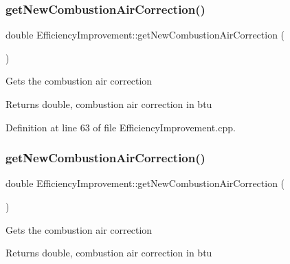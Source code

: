 \subsubsection{\texorpdfstring{get\+New\+Combustion\+Air\+Correction()}{getNewCombustionAirCorrection()}\hspace{0.1cm}{\footnotesize\ttfamily [2/3]}}
{\footnotesize\ttfamily double Efficiency\+Improvement\+::get\+New\+Combustion\+Air\+Correction (\begin{DoxyParamCaption}{ }\end{DoxyParamCaption})}

Gets the combustion air correction

\begin{DoxyReturn}{Returns}
double, combustion air correction in btu 
\end{DoxyReturn}


Definition at line 63 of file Efficiency\+Improvement.\+cpp.

\mbox{\label{class_efficiency_improvement_abcbe174b3f94a20679dff0f5bff6a330}} 
\subsubsection{\texorpdfstring{get\+New\+Combustion\+Air\+Correction()}{getNewCombustionAirCorrection()}\hspace{0.1cm}{\footnotesize\ttfamily [3/3]}}
{\footnotesize\ttfamily double Efficiency\+Improvement\+::get\+New\+Combustion\+Air\+Correction (\begin{DoxyParamCaption}{ }\end{DoxyParamCaption})}

Gets the combustion air correction

\begin{DoxyReturn}{Returns}
double, combustion air correction in btu 
\end{DoxyReturn}
\mbox{\label{class_efficiency_improvement_a6a699fe87fec378962c2ee1505600dce}} 
